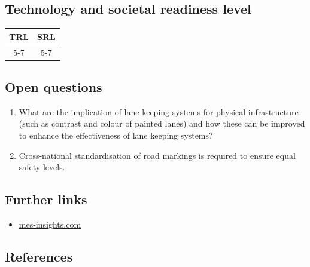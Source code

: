 \documentclass[
]{book}
\providecommand{\tightlist}{%
  \setlength{\itemsep}{0pt}\setlength{\parskip}{0pt}}
\begin{document}
\hypertarget{technology-and-societal-readiness-level-25}{%
\subsection*{Technology and societal readiness level}\label{technology-and-societal-readiness-level-25}}

\begin{longtable}[]{@{}cc@{}}
\toprule
TRL & SRL\tabularnewline
\midrule
\endhead
5-7 & 5-7\tabularnewline
\bottomrule
\end{longtable}

\hypertarget{open-questions-25}{%
\subsection*{Open questions}\label{open-questions-25}}

\begin{enumerate}
\def\labelenumi{\arabic{enumi}.}
\tightlist
\item
  What are the implication of lane keeping systems for physical infrastructure (such as contrast and colour of painted lanes) and how these can be improved to enhance the effectiveness of lane keeping systems?
\item
  Cross-national standardisation of road markings is required to ensure equal safety levels.
\end{enumerate}

\hypertarget{further-links-22}{%
\subsection*{Further links}\label{further-links-22}}

\begin{itemize}
\tightlist
\item
  \href{https://www.mes-insights.com/automated-lane-keeping-systems-pave-the-autonomous-car-future-a-965712/}{mes-insights.com}
\end{itemize}

\hypertarget{references-25}{%
\subsection*{References}\label{references-25}}
\end{document}
